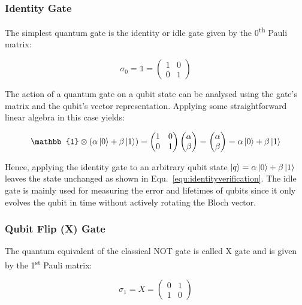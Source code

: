 \subsubsection{Identity Gate}
\label{subsubsubsec:identitygate}

The simplest quantum gate is the identity or idle gate given by the 0\textsuperscript{th} Pauli matrix:

\begin{equation}
\sigma_{0} = \mathbb{1} = \begin{pmatrix}
 1 & 0 \\ 
 0 & 1
 \end{pmatrix}
\end{equation}

The action of a quantum gate on a qubit state can be analysed using the gate's matrix and the qubit's vector representation. Applying some straightforward linear algebra in this case yields:

\begin{equation}
\label{equ:identityverification}
\mathbb{1} \otimes (\alpha \ket{0} + \beta \ket{1}) = \begin{pmatrix}
 1 & 0 \\ 
 0 & 1
 \end{pmatrix} \begin{pmatrix}
 \alpha  \\ 
 \beta
 \end{pmatrix} = \begin{pmatrix}
 \alpha  \\ 
 \beta
 \end{pmatrix} = \alpha \ket{0} + \beta \ket{1}
\end{equation}

Hence, applying the identity gate to an arbitrary qubit state $\ket{q} = \alpha \ket{0} + \beta \ket{1}$ leaves the state unchanged as shown in Equ.~\ref{equ:identityverification}. The idle gate is mainly used for measuring the error and lifetimes of qubits since it only evolves the qubit in time without actively rotating the Bloch vector.

\subsubsection{Qubit Flip (X) Gate}
\label{subsubsubsec:xgate}

The quantum equivalent of the classical NOT gate is called X gate and is given by the 1\textsuperscript{st} Pauli matrix:

\begin{equation}
\sigma_{1} = X = \begin{pmatrix}
 0 & 1 \\ 
 1 & 0
 \end{pmatrix}
\end{equation}

